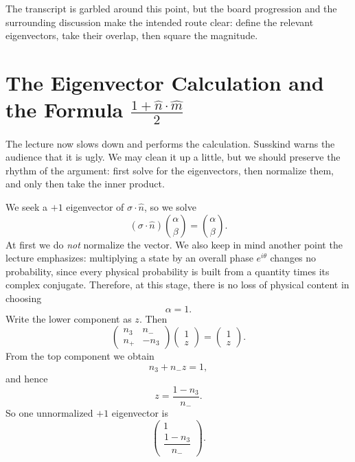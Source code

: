 The transcript is garbled around this point, but the board progression and the surrounding discussion make the intended route clear: define the relevant eigenvectors, take their overlap, then square the magnitude.

\section{The Eigenvector Calculation and the Formula \texorpdfstring{$\frac{1+\hat n\cdot\hat m}{2}$}{(1+n.m)/2}}

The lecture now slows down and performs the calculation. Susskind warns the audience that it is ugly. We may clean it up a little, but we should preserve the rhythm of the argument: first solve for the eigenvectors, then normalize them, and only then take the inner product.

We seek a \(+1\) eigenvector of \(\sigma\cdot\hat n\), so we solve
\begin{equation}
(\sigma\cdot\hat n)\binom{\alpha}{\beta}=\binom{\alpha}{\beta}.
\end{equation}
At first we do \emph{not} normalize the vector. We also keep in mind another point the lecture emphasizes: multiplying a state by an overall phase \(e^{i\theta}\) changes no probability, since every physical probability is built from a quantity times its complex conjugate. Therefore, at this stage, there is no loss of physical content in choosing
\begin{equation}
\alpha=1.
\end{equation}
Write the lower component as \(z\). Then
\begin{equation}
\begin{pmatrix}
n_3 & n_- \\
n_+ & -n_3
\end{pmatrix}
\begin{pmatrix}
1\\
z
\end{pmatrix}
=
\begin{pmatrix}
1\\
z
\end{pmatrix}.
\end{equation}
From the top component we obtain
\begin{equation}
n_3+n_-z=1,
\end{equation}
and hence
\begin{equation}
z=\frac{1-n_3}{n_-}.
\end{equation}
So one unnormalized \(+1\) eigenvector is
\begin{equation}
\begin{pmatrix}
1\\[4pt]
\dfrac{1-n_3}{n_-}
\end{pmatrix}.
\end{equation}

